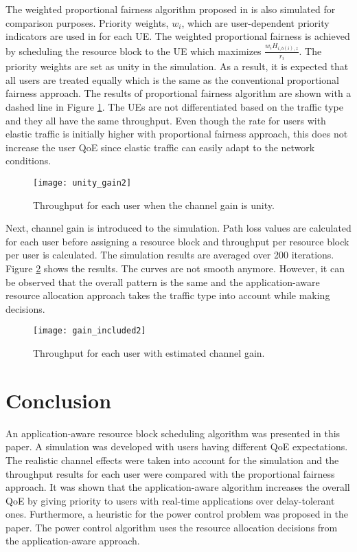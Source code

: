 \documentclass[journal]{IEEEtran} 				\IEEEoverridecommandlockouts 	\usepackage{amsmath,amssymb}
\begin{document}
The weighted proportional fairness algorithm proposed in \cite{SelfOrganizedLTE} is also simulated for comparison purposes. Priority weights, $w_i$, which are user-dependent priority indicators are used in \cite{SelfOrganizedLTE} for each UE. The weighted proportional fairness is achieved by scheduling the resource block to the UE which maximizes $\frac{w_i H_{i,b(i),z}}{r_i}$. The priority weights are set as unity in the simulation. As a result, it is expected that all users are treated equally which is the same as the conventional proportional fairness approach. The results of proportional fairness algorithm are shown with a dashed line in Figure \ref{fig:sim:UnityGain}. The UEs are not differentiated based on the traffic type and they all have the same throughput. Even though the rate for users with elastic traffic is initially higher with proportional fairness approach, this does not increase the user QoE since elastic traffic can easily adapt to the network conditions.  
 
\begin{figure}
    \centering
    \texttt{[image: unity\_gain2]}
    \captionsetup{justification=centering}
    \caption{Throughput for each user when the channel gain is unity.}
    \label{fig:sim:UnityGain}
\end{figure} 

Next, channel gain is introduced to the simulation. Path loss values are calculated for each user before assigning a resource block and throughput per resource block per user is calculated. The simulation results are averaged over 200 iterations. Figure \ref{fig:sim:GainIncluded} shows the results. The curves are not smooth anymore. However, it can be observed that the overall pattern is the same and the application-aware resource allocation approach takes the traffic type into account while making decisions.

\begin{figure}
    \centering
    \texttt{[image: gain\_included2]}
    \captionsetup{justification=centering}
    \caption{Throughput for each user with estimated channel gain.}
    \label{fig:sim:GainIncluded}
\end{figure} 

\section{Conclusion}\label{sec:conclude}
An application-aware resource block scheduling algorithm was presented in this paper. A simulation was developed with users having different QoE expectations. The realistic channel effects were taken into account for the simulation and the throughput results for each user were compared with the proportional fairness approach. It was shown that the application-aware algorithm increases the overall QoE by giving priority to users with real-time applications over delay-tolerant ones. Furthermore, a heuristic for the power control problem was proposed in the paper. The power control algorithm uses the resource allocation decisions from the application-aware approach.


\end{document}
